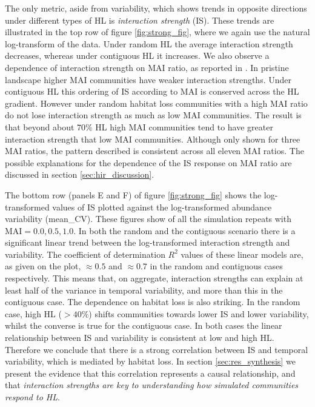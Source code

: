 The only metric, aside from variability, which shows trends in opposite directions under different types of HL is \emph{interaction strength} (IS). These trends are illustrated in the top row of figure \ref{fig:strong_fig}, where we again use the natural log-transform of the data. Under random HL the average interaction strength decreases, whereas under contiguous HL it increases. We also observe a dependence of interaction strength on MAI ratio, as reported in \cite{lurgi2015effects}. In pristine landscape higher MAI communities have weaker interaction strengths. Under contiguous HL this ordering of IS according to MAI is conserved across the HL gradient. However under random habitat loss communities with a high MAI ratio do not lose interaction strength as much as low MAI communities. The result is that beyond about $70\%$ HL high MAI communities tend to have greater interaction strength that low MAI communities. Although only shown for three MAI ratios, the pattern described is consistent across all eleven MAI ratios. The possible explanations for the dependence of the IS response on MAI ratio are discussed in section \ref{sec:hir_discussion}.

The bottom row (panels E and F) of figure \ref{fig:strong_fig} shows the log-transformed values of IS plotted against the log-transformed abundance variability (mean\_CV). These figures show of all the simulation repeats with MAI$=0.0,0.5,1.0$. In both the random and the contiguous scenario there is a significant linear trend between the log-transformed interaction strength and variability. The coefficient of determination $R^2$ values of these linear models are, as given on the plot, $\approx 0.5$ and $\approx 0.7$ in the random and contiguous cases respectively. This means that, on aggregate, interaction strengths can explain at least half of the variance in temporal variability, and more than this in the contiguous case. The dependence on habitat loss is also striking. In the random case, high HL ($>40\%$) shifts communities towards lower IS and lower variability, whilst the converse is true for the contiguous case. In both cases the linear relationship between IS and variability is consistent at low and high HL. Therefore we conclude that there is a strong correlation between IS and temporal variability, which is mediated by habitat loss. In section \ref{sec:res_synthesis} we present the evidence that this correlation represents  a causal relationship, and that \emph{interaction strengths are key to understanding how simulated communities respond to HL}.   

